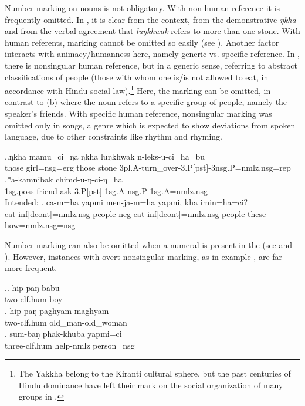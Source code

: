 Number marking on nouns is not obligatory. With non-human  reference it is frequently omitted.  In \Next[a], it is clear from the context, from the demonstrative \emph{ŋkha} and from the verbal agreement that \emph{luŋkhwak} refers to more than one stone. With human referents,  marking cannot be omitted so easily (see \Next[b]). Another factor interacts with animacy/humanness here, namely generic vs. specific reference. In \Next[c], there is nonsingular human reference, but in a generic sense, referring to abstract classifications of people (those with whom one is/is not allowed to eat, in accordance with Hindu social law).\footnote{The Yakkha belong to the Kiranti cultural sphere, but the past centuries of Hindu dominance have left their mark on the social organization of many  groups in .} Here, the  marking can be omitted, in contrast to  (b) where the noun refers to a specific group of people, namely the speaker's friends. With specific human reference, nonsingular marking was omitted only in songs, a genre which is expected to show deviations from spoken language, due to other constraints like rhythm and rhyming.


\ex.\ag.ŋkha mamu=ci=ŋa ŋkha luŋkhwak n-leks-u-ci=ha=bu\\
 those girl{\sc =nsg=erg} those stone {\sc 3pl.A-}turn\_over{\sc -3.P[pst]-3nsg.P=nmlz.nsg=rep}\\
  
\bg.*a-kamnibak chimd-u-ŋ-ci-ŋ=ha\\
{\sc 1sg.poss-}friend ask{\sc -3.P[pst]-1sg.A-nsg.P-1sg.A=nmlz.nsg}\\
Intended:  
\bg. ca-m=ha  yapmi  men-ja-m=ha yapmi,  kha imin=ha=ci?\\
	eat-{\sc inf[deont]=nmlz.nsg} people {\sc neg}-eat-{\sc inf[deont]=nmlz.nsg} people these how{\sc =nmlz.nsg=nsg} 		\\
	 
	
	
Number marking can also be omitted when a numeral is present in the  (see \Next[a] and \Next[b]). However, instances with overt nonsingular marking, as in  example \Next[c], are far more frequent.

\ex.\ag.  hip-paŋ     babu\\
two{\sc -clf.hum} boy\\
\bg. hip-paŋ     paghyam-maghyam\\
two{\sc -clf.hum} old\_man-old\_woman\\
 
\bg. sum-baŋ       phak-khuba      yapmi=ci\\
three{\sc -clf.hum} help{\sc -nmlz} person{\sc =nsg}\\
  
  

